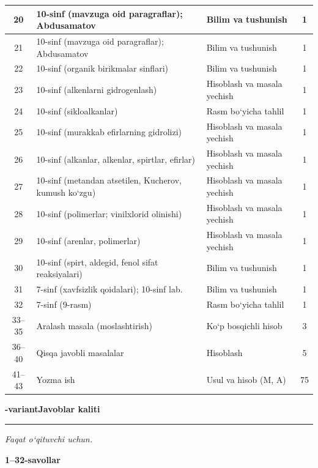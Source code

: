 \documentclass[11pt,a4paper]{article}
\newcommand{\hdrpill}[1]{\begin{tikzpicture}[baseline=0pt]\node[fill=ygreen,text=white,rounded corners=8pt,inner xsep=10pt,inner ysep=5pt,font=\fontsize{13}{15}\bfseries\selectfont] at (0,0.475){#1};\end{tikzpicture}}
\newcommand{\curvar}{}\fancyhead[R]{\hdrpill{\curvar}}
\begin{document}
{\begin{longtable}{|c|p{7.2cm}|p{5.4cm}|c|}
20 & 10-sinf (mavzuga oid paragraflar); Abdusamatov & Bilim va tushunish & 1\\\hline
21 & 10-sinf (mavzuga oid paragraflar); Abdusamatov & Bilim va tushunish & 1\\\hline
22 & 10-sinf (organik birikmalar sinflari) & Bilim va tushunish & 1\\\hline
23 & 10-sinf (alkenlarni gidrogenlash) & Hisoblash va masala yechish & 1\\\hline
24 & 10-sinf (sikloalkanlar) & Rasm bo`yicha tahlil & 1\\\hline
25 & 10-sinf (murakkab efirlarning gidrolizi) & Hisoblash va masala yechish & 1\\\hline
26 & 10-sinf (alkanlar, alkenlar, spirtlar, efirlar) & Hisoblash va masala yechish & 1\\\hline
27 & 10-sinf (metandan atsetilen, Kucherov, kumush ko`zgu) & Hisoblash va masala yechish & 1\\\hline
28 & 10-sinf (polimerlar; vinilxlorid olinishi) & Hisoblash va masala yechish & 1\\\hline
29 & 10-sinf (arenlar, polimerlar) & Hisoblash va masala yechish & 1\\\hline
30 & 10-sinf (spirt, aldegid, fenol sifat reaksiyalari) & Bilim va tushunish & 1\\\hline
31 & 7-sinf (xavfsizlik qoidalari); 10-sinf lab. & Bilim va tushunish & 1\\\hline
32 & 7-sinf (9-rasm) & Rasm bo`yicha tahlil & 1\\\hline
33--35 & Aralash masala (moslashtirish) & Ko`p bosqichli hisob & 3\\\hline
36--40 & Qisqa javobli masalalar & Hisoblash & 5\\\hline
41--43 & Yozma ish & Usul va hisob (M, A) & 75\\\hline
\end{longtable}}
\renewcommand{\curvar}{Javoblar}
\newpage
\noindent\textbf{\fontsize{13}{15}-variant}\hfill \textbf{Javoblar kaliti}\par\smallskip\hrule\smallskip
\textit{Faqat o`qituvchi uchun.}\par\medskip
\noindent\textbf{1--32-savollar}\par\smallskip
\end{document}
